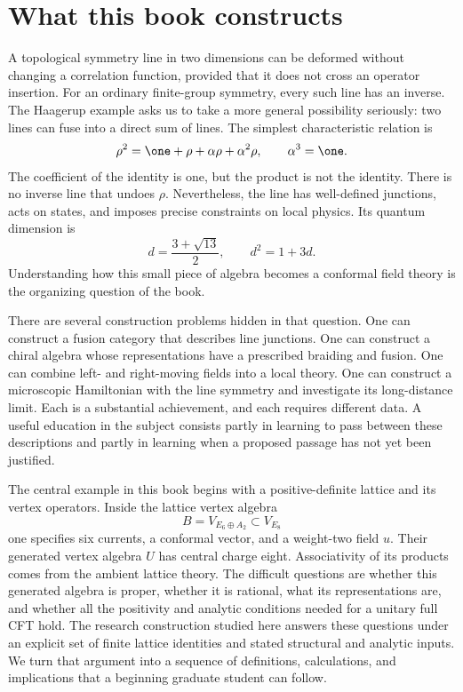 \chapter{What this book constructs}

A topological symmetry line in two dimensions can be deformed without
changing a correlation function, provided that it does not cross an
operator insertion. For an ordinary finite-group symmetry, every such
line has an inverse. The Haagerup example asks us to take a more general
possibility seriously: two lines can fuse into a direct sum of lines.
The simplest characteristic relation is
\[
 \rho^2=\one+\rho+\alpha\rho+\alpha^2\rho,
 \qquad \alpha^3=\one.
\]
The coefficient of the identity is one, but the product is not the
identity. There is no inverse line that undoes $\rho$. Nevertheless,
the line has well-defined junctions, acts on states, and imposes precise
constraints on local physics. Its quantum dimension is
\[
 d=\frac{3+\sqrt{13}}2,
 \qquad d^2=1+3d.
\]
Understanding how this small piece of algebra becomes a conformal field
theory is the organizing question of the book.

There are several construction problems hidden in that question. One
can construct a fusion category that describes line junctions. One can
construct a chiral algebra whose representations have a prescribed
braiding and fusion. One can combine left- and right-moving fields into
a local theory. One can construct a microscopic Hamiltonian with the
line symmetry and investigate its long-distance limit. Each is a
substantial achievement, and each requires different data. A useful
education in the subject consists partly in learning to pass between
these descriptions and partly in learning when a proposed passage has
not yet been justified.

The central example in this book begins with a positive-definite lattice
and its vertex operators. Inside the lattice vertex algebra
\[
 B=V_{E_6\oplus A_2}\subset V_{E_8}
\]
one specifies six currents, a conformal vector, and a weight-two field
$u$. Their generated vertex algebra $U$ has central charge eight.
Associativity of its products comes from the ambient lattice theory.
The difficult questions are whether this generated algebra is proper,
whether it is rational, what its representations are, and whether all
the positivity and analytic conditions needed for a unitary full CFT
hold. The research construction studied here answers these questions
under an explicit set of finite lattice identities and stated
structural and analytic inputs. We turn that argument into a sequence
of definitions, calculations, and implications that a beginning
graduate student can follow.

